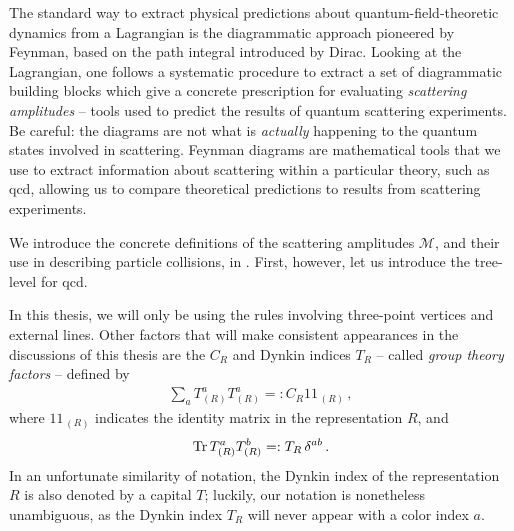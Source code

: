
The standard way to extract physical predictions about quantum-field-theoretic dynamics from a Lagrangian is the diagrammatic approach pioneered by Feynman, based on the path integral introduced by Dirac.
%
Looking at the Lagrangian, one follows a systematic procedure to extract a set of diagrammatic building blocks which give a concrete prescription for evaluating \textit{scattering amplitudes} -- tools used to predict the results of quantum scattering experiments.
%
Be careful:
%
the diagrams are not what is \textit{actually} happening to the quantum states involved in scattering.
%
Feynman diagrams are mathematical tools that we use to extract information about scattering within a particular theory, such as \gls{qcd}, allowing us to compare theoretical predictions to results from scattering experiments.


We introduce the concrete definitions of the scattering amplitudes \(\mathcal{M}\), and their use in describing particle collisions, in .
%
First, however, let us introduce the tree-level  for \gls{qcd}.





In this thesis, we will only be using the rules involving three-point vertices and external lines.
%
Other factors that will make consistent appearances in the discussions of this thesis are the  \(C_R\) and Dynkin indices \(T_R\) -- called \textit{group theory factors} -- defined by
\begin{align}
    \sum_a
    T^a_{(R)} T^a_{(R)}
    =:
    C_R
    1\!\!1_{\,(R)}
    \,,
\end{align}
where \(1\!\!1_{\,(R)}\) indicates the identity matrix in the representation \(R\), and
\begin{align}
    \Tr T^a_{(R)} T^b_{(R)}
    =:
    T_R \, \delta^{ab}
    \,.
\end{align}
In an unfortunate similarity of notation, the Dynkin index of the representation \(R\) is also denoted by a capital \(T\);
%
luckily, our notation is nonetheless unambiguous, as the Dynkin index \(T_R\) will never appear with a color index \(a\).


